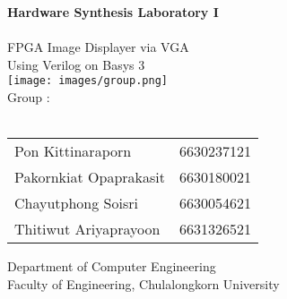 \begin{titlepage}
    \begin{center}
        {\Large \textbf{Hardware Synthesis Laboratory I}}\\[1.5cm]
        
        {\huge \bfseries \moduleTitle}\\[0.8cm]
        
        {\Large FPGA Image Displayer via VGA \\[0.2cm]
        Using Verilog on Basys 3}\\[1.2cm]
        
        \texttt{[image: images/group.png]}\\[1.2cm]
        
        {\large {Group \groupNumber:\\[0.3cm]
        \Large{\textbf\groupName}}}\\[1.2cm]

        
        \renewcommand{\arraystretch}{1.2}
        \begin{table}[h]
            \centering
            {\large
            \begin{tabular}{L{4.7cm}c}
                Pon Kittinaraporn      & 6630237121 \\
                Pakornkiat Opaprakasit & 6630180021 \\
                Chayutphong Soisri     & 6630054621 \\
                Thitiwut Ariyaprayoon  & 6631326521 \\
            \end{tabular}
            }
        \end{table}

        \vspace*{\fill}
        {\large Department of Computer Engineering}\\
        {\large Faculty of Engineering, Chulalongkorn University}
    \end{center}
\end{titlepage}
